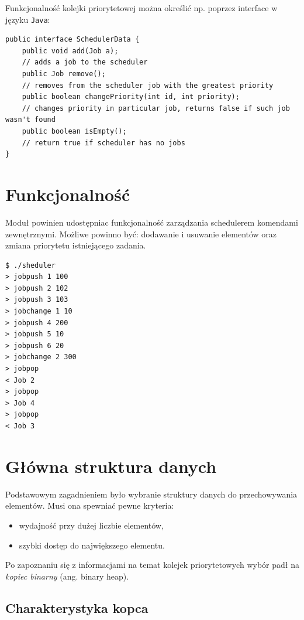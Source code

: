 \documentclass[12pt,a4paper]{article}
\begin{document}
Funkcjonalność kolejki priorytetowej można określić np. poprzez interface w języku \texttt{Java}:

\begin{lstlisting}[caption=Interface kolejki priorytetowej]
public interface SchedulerData {
    public void add(Job a); 
    // adds a job to the scheduler    
    public Job remove(); 
    // removes from the scheduler job with the greatest priority
    public boolean changePriority(int id, int priority); 
    // changes priority in particular job, returns false if such job wasn't found
    public boolean isEmpty(); 
    // return true if scheduler has no jobs
}
\end{lstlisting}

\section{Funkcjonalność}

Moduł powinien udostępniac funkcjonalność zarządzania schedulerem komendami zewnętrznymi. Możliwe powinno być: dodawanie i usuwanie elementów oraz zmiana priorytetu istniejącego zadania.

\begin{lstlisting}[caption=Przykładowa sesja modułu]
$ ./sheduler
> jobpush 1 100
> jobpush 2 102
> jobpush 3 103
> jobchange 1 10
> jobpush 4 200
> jobpush 5 10
> jobpush 6 20
> jobchange 2 300
> jobpop
< Job 2
> jobpop
> Job 4
> jobpop
< Job 3
\end{lstlisting}
\section{Główna struktura danych}

Podstawowym zagadnieniem było wybranie struktury danych do przechowywania elementów. Musi ona spewniać pewne kryteria:

\begin{itemize}
	\item wydajność przy dużej liczbie elementów,
	\item szybki dostęp do największego elementu.
\end{itemize}

Po zapoznaniu się z informacjami na temat kolejek priorytetowych wybór padł na \textit{kopiec binarny} (ang. binary heap).

\subsection{Charakterystyka kopca}
\end{document}
